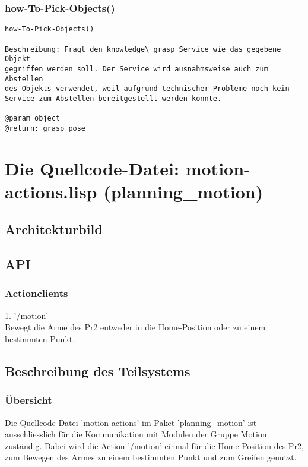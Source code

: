 \documentclass{suturo}
\begin{document}
\subsubsection{how-To-Pick-Objects()}
\begin{verbatim}
how-To-Pick-Objects()

Beschreibung: Fragt den knowledge\_grasp Service wie das gegebene Objekt 
gegriffen werden soll. Der Service wird ausnahmsweise auch zum Abstellen 
des Objekts verwendet, weil aufgrund technischer Probleme noch kein
Service zum Abstellen bereitgestellt werden konnte.

@param object
@return: grasp pose
\end{verbatim}


\section{Die Quellcode-Datei: motion-actions.lisp (planning\_motion)}
\subsection{Architekturbild}


\begin{figure}[!htb]
\end{figure}




\subsection{API}
\subsubsection{Actionclients}
1. '/motion' \\
Bewegt die Arme des Pr2 entweder in die Home-Position oder zu einem bestimmten Punkt.
\subsection{Beschreibung des Teilsystems}
\subsubsection{\"Ubersicht}
Die Quellcode-Datei 'motion-actions' im Paket 'planning\_motion'  ist ausschliesslich für die Kommunikation mit Modulen der Gruppe Motion zuständig. Dabei wird die Action '/motion' einmal für die Home-Position des Pr2, zum Bewegen des Armes zu einem bestimmten Punkt und zum Greifen genutzt.
\end{document}
